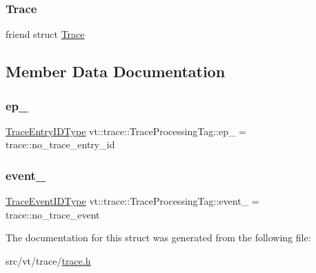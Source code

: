 \subsubsection{\texorpdfstring{Trace}{Trace}}
{\footnotesize\ttfamily friend struct \hyperlink{structvt_1_1trace_1_1_trace}{Trace}\hspace{0.3cm}{\ttfamily [friend]}}



\subsection{Member Data Documentation}
\mbox{\label{structvt_1_1trace_1_1_trace_processing_tag_a60c4d398c815ba8b140f328ce546a918}} 
\subsubsection{\texorpdfstring{ep\+\_\+}{ep\_}}
{\footnotesize\ttfamily \hyperlink{namespacevt_1_1trace_a3c14050715ba9eceaeff51fb3de64f2f}{Trace\+Entry\+I\+D\+Type} vt\+::trace\+::\+Trace\+Processing\+Tag\+::ep\+\_\+ = trace\+::no\+\_\+trace\+\_\+entry\+\_\+id\hspace{0.3cm}{\ttfamily [private]}}

\mbox{\label{structvt_1_1trace_1_1_trace_processing_tag_ac0ed5366eaeca6f02cb4db7bafdaf732}} 
\subsubsection{\texorpdfstring{event\+\_\+}{event\_}}
{\footnotesize\ttfamily \hyperlink{namespacevt_1_1trace_a64a7185f3e102df8d8258f263ccd1582}{Trace\+Event\+I\+D\+Type} vt\+::trace\+::\+Trace\+Processing\+Tag\+::event\+\_\+ = trace\+::no\+\_\+trace\+\_\+event\hspace{0.3cm}{\ttfamily [private]}}



The documentation for this struct was generated from the following file\+:\begin{DoxyCompactItemize}
\item 
src/vt/trace/\hyperlink{trace_8h}{trace.\+h}\end{DoxyCompactItemize}
